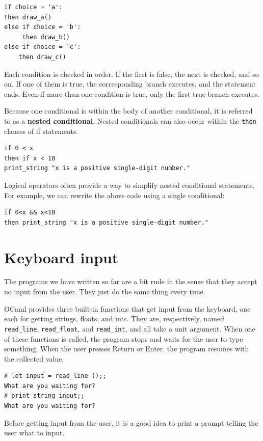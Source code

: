 \documentclass[10pt]{book}
\begin{document}
\beforeverb
\begin{verbatim}
if choice = 'a':
then draw_a()
else if choice = 'b':
     then draw_b()
else if choice = 'c':
    then draw_c()
\end{verbatim}
\afterverb
%
Each condition is checked in order.  If the first is false,
the next is checked, and so on.  If one of them is
true, the corresponding branch executes, and the statement
ends.  Even if more than one condition is true, only the
first true branch executes.

Because one conditional is within the body of another conditional,
it is referred to as a {\bf nested conditional}. Nested conditionals
can also occur within the {\tt then} clauses of if statements.

\beforeverb
\begin{verbatim}
if 0 < x
then if x < 10
print_string "x is a positive single-digit number."
\end{verbatim}
\afterverb

Logical operators often provide a way to simplify nested conditional
statements.  For example, we can rewrite the above code using a
single conditional:

\beforeverb
\begin{verbatim}
if 0<x && x<10
then print_string "x is a positive single-digit number."
\end{verbatim}
\afterverb

\section{Keyboard input}

The programs we have written so far are a bit rude in the sense that
they accept no input from the user.  They just do the same thing every
time.

OCaml provides three built-in functions that get input from the keyboard, 
one each for getting strings, floats, and ints. They are, respectively, 
named {\tt \verb"read_line"}, {\tt \verb"read_float"}, and {\tt \verb"read_int"}, and all take
a unit argument. When one of these functions is called, the program stops 
and waits for the user to type something.  When the user presses {\sf Return} 
or {\sf Enter}, the program resumes with the collected value.


\beforeverb
\begin{verbatim}
# let input = read_line ();;
What are you waiting for?
# print_string input;;
What are you waiting for?
\end{verbatim}
\afterverb
%
Before getting input from the user, it is a good idea to print a
prompt telling the user what to input.
\end{document}
